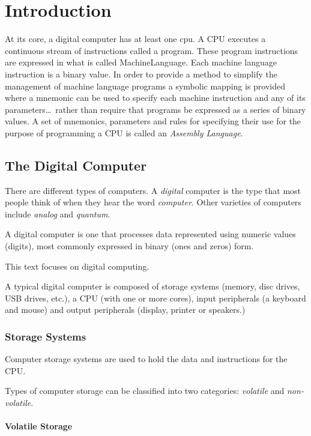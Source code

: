 \chapter{Introduction}
\label{chapter:Introduction}

At its core, a digital computer has at least one \acrfull{cpu}.  A
CPU executes a continuous stream of instructions called a \gls{program}.
These program instructions are expressed in what is called
\gls{MachineLanguage}.  Each machine language instruction is a \gls{binary} value.
In order to provide a method to simplify the management of machine language
programs a symbolic mapping is provided where a \gls{mnemonic} can be used to
specify each machine instruction and any of its parameters\ldots\ rather
than require that programs be expressed as a series of binary values.
A set of mnemonics, parameters and rules for specifying their use for
the purpose of programming a CPU is called an {\em Assembly Language}.

\section{The Digital Computer}

There are different types of computers.  A {\em digital} computer is
the type that most people think of when they hear the word {\em computer}.
Other varieties of computers include {\em analog} and {\em quantum}.

A digital computer is one that processes data represented
using numeric values (digits), most commonly expressed in binary
(ones and zeros) form.

This text focuses on digital computing.

A typical digital computer is composed of storage systems (memory, disc
drives, USB drives, etc.), a CPU (with one or more cores), input peripherals
(a keyboard and mouse) and output peripherals (display, printer or speakers.)

\subsection{Storage Systems}

Computer storage systems are used to hold the data and instructions
for the CPU.

Types of computer storage can be classified into two categories:
{\em volatile} and {\em non-volatile}.

\subsubsection{Volatile Storage}
\label{VolatileStorage}

